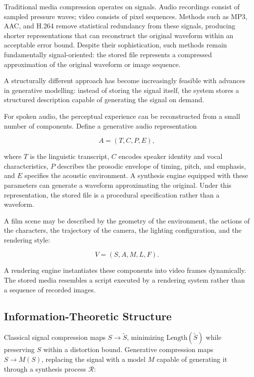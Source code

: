 \documentclass[12pt,a4paper]{article}
\theoremstyle{plain}
\theoremstyle{definition}
\begin{document}
Traditional media compression operates on signals. Audio recordings consist of sampled pressure waves; video consists of pixel sequences. Methods such as MP3, AAC, and H.264 remove statistical redundancy from these signals, producing shorter representations that can reconstruct the original waveform within an acceptable error bound. Despite their sophistication, such methods remain fundamentally signal-oriented: the stored file represents a compressed approximation of the original waveform or image sequence.

A structurally different approach has become increasingly feasible with advances in generative modelling: instead of storing the signal itself, the system stores a structured description capable of generating the signal on demand.

For spoken audio, the perceptual experience can be reconstructed from a small number of components. Define a generative audio representation

\begin{equation}
A = (T, C, P, E),
\end{equation}

where $T$ is the linguistic transcript, $C$ encodes speaker identity and vocal characteristics, $P$ describes the prosodic envelope of timing, pitch, and emphasis, and $E$ specifies the acoustic environment. A synthesis engine equipped with these parameters can generate a waveform approximating the original. Under this representation, the stored file is a procedural specification rather than a waveform.

A film scene may be described by the geometry of the environment, the actions of the characters, the trajectory of the camera, the lighting configuration, and the rendering style:

\begin{equation}
V = (S, A, M, L, F).
\end{equation}

A rendering engine instantiates these components into video frames dynamically. The stored media resembles a script executed by a rendering system rather than a sequence of recorded images.

\subsection{Information-Theoretic Structure}

Classical signal compression maps $S \to \tilde{S}$, minimizing $\text{Length}(\tilde{S})$ while preserving $S$ within a distortion bound. Generative compression maps $S \to M(S)$, replacing the signal with a model $M$ capable of generating it through a synthesis process $\mathcal{R}$:
\end{document}
